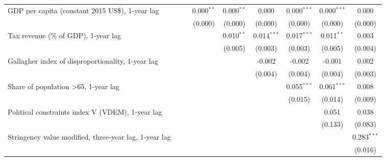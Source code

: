 \begin{table}[htbp]
\begin{tabular}{lcccccccc}
      GDP per capita (constant 2015 US\$), 1-year lag                        &         &         & 0.000$^{**}$ & 0.000$^{**}$ & 0.000         & 0.000$^{***}$ & 0.000$^{***}$ & 0.000\\   
                                                                             &         &         & (0.000)      & (0.000)      & (0.000)       & (0.000)       & (0.000)       & (0.000)\\   
      Tax revenue (\% of GDP), 1-year lag                                    &         &         &              & 0.010$^{**}$ & 0.014$^{***}$ & 0.017$^{***}$ & 0.011$^{**}$  & 0.003\\   
                                                                             &         &         &              & (0.005)      & (0.003)       & (0.003)       & (0.005)       & (0.004)\\   
      Gallagher index of disproportionality, 1-year lag                      &         &         &              &              & -0.002        & -0.002        & -0.001        & 0.002\\   
                                                                             &         &         &              &              & (0.004)       & (0.004)       & (0.004)       & (0.003)\\   
      Share of population >65, 1-year lag                                    &         &         &              &              &               & 0.055$^{***}$ & 0.061$^{***}$ & 0.008\\   
                                                                             &         &         &              &              &               & (0.015)       & (0.014)       & (0.009)\\   
      Political constraints index V (VDEM), 1-year lag                       &         &         &              &              &               &               & 0.051         & 0.038\\   
                                                                             &         &         &              &              &               &               & (0.133)       & (0.083)\\   
      Stringency value modified, three-year lag, 1-year lag                  &         &         &              &              &               &               &               & 0.283$^{***}$\\   
                                                                             &         &         &              &              &               &               &               & (0.016)\\   

\end{tabular}
\end{table}
